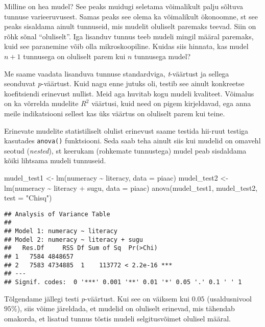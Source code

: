 \documentclass[
]{book}
\newenvironment{Shaded}{\begin{snugshade}}{\end{snugshade}}
\newcommand{\AttributeTok}[1]{\textcolor[rgb]{0.77,0.63,0.00}{#1}}
\newcommand{\FunctionTok}[1]{\textcolor[rgb]{0.00,0.00,0.00}{#1}}
\newcommand{\NormalTok}[1]{#1}
\newcommand{\OtherTok}[1]{\textcolor[rgb]{0.56,0.35,0.01}{#1}}
\newcommand{\SpecialCharTok}[1]{\textcolor[rgb]{0.00,0.00,0.00}{#1}}
\newcommand{\StringTok}[1]{\textcolor[rgb]{0.31,0.60,0.02}{#1}}
\begin{document}
Milline on hea mudel? See peaks muidugi seletama võimalikult palju sõltuva tunnuse varieeruvusest. Samas peaks see olema ka võimalikult ökonoomne, st see peaks sisaldama ainult tunnuseid, mis mudelit oluliselt paremaks teevad. Siin on rõhk sõnal ``oluliselt''. Iga lisanduv tunnus teeb mudeli mingil määral paremaks, kuid see paranemine võib olla mikroskoopiline. Kuidas siis hinnata, kas mudel \(n+1\) tunnusega on oluliselt parem kui \(n\) tunnusega mudel?

Me saame vaadata lisanduva tunnuse standardviga, \emph{t}-väärtust ja sellega seonduvat \emph{p}-väärtust. Kuid nagu enne jutuks oli, testib see ainult konkreetse koefitsiendi erinevust nullist. Meid aga huvitab kogu mudeli kvaliteet. Võimalus on ka võrrelda mudelite \(R^2\) väärtusi, kuid need on pigem kirjeldavad, ega anna meile indikatsiooni sellest kas üks väärtus on oluliselt parem kui teine.

Erinevate mudelite statistiliselt olulist erinevust saame testida hii-ruut testiga kasutades \texttt{anova()} funktsiooni. Seda saab teha ainult siis kui mudelid on omavehl seotud (\emph{nested}), st keerukam (rohkemate tunnustega) mudel peab sisdaldama kõiki lihtsama mudeli tunnuseid.

\begin{Shaded}
\begin{Highlighting}[]
\NormalTok{mudel\_test1 }\OtherTok{\textless{}{-}} \FunctionTok{lm}\NormalTok{(numeracy }\SpecialCharTok{\textasciitilde{}}\NormalTok{ literacy, }\AttributeTok{data =}\NormalTok{ piaac)}
\NormalTok{mudel\_test2 }\OtherTok{\textless{}{-}} \FunctionTok{lm}\NormalTok{(numeracy }\SpecialCharTok{\textasciitilde{}}\NormalTok{ literacy }\SpecialCharTok{+}\NormalTok{ sugu, }\AttributeTok{data =}\NormalTok{ piaac)}
\FunctionTok{anova}\NormalTok{(mudel\_test1, mudel\_test2, }\AttributeTok{test =} \StringTok{"Chisq"}\NormalTok{)}
\end{Highlighting}
\end{Shaded}

\begin{verbatim}
## Analysis of Variance Table
## 
## Model 1: numeracy ~ literacy
## Model 2: numeracy ~ literacy + sugu
##   Res.Df     RSS Df Sum of Sq  Pr(>Chi)    
## 1   7584 4848657                           
## 2   7583 4734885  1    113772 < 2.2e-16 ***
## ---
## Signif. codes:  0 '***' 0.001 '**' 0.01 '*' 0.05 '.' 0.1 ' ' 1
\end{verbatim}

Tõlgendame jällegi testi \emph{p}-väärtust. Kui see on väiksem kui \(0.05\) (usaldusnivool \(95\%\)), siis võime järeldada, et mudelid on oluliselt erinevad, mis tähendab omakorda, et lisatud tunnus tõstis mudeli selgitusvõimet olulisel määral.
\end{document}
